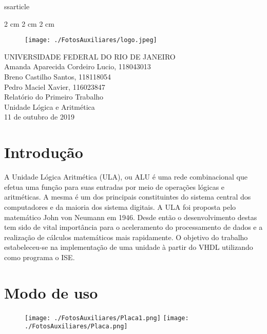 ss{article}
\usepackage[utf8]{inputenc}
\usepackage[brazil]{babel}
\usepackage{courier}
\usepackage{minted}
\usepackage{anysize}
\usepackage{graphicx}
\usepackage{url}
\usepackage{float}
\marginsize {2 cm} {2 cm} {2 cm} {2 cm} 

\begin{titlepage}
\begin{center}
\begin{figure}[H] %
    \centering
    \texttt{[image: ./FotosAuxiliares/logo.jpeg]}
\end{figure}
{\large UNIVERSIDADE FEDERAL DO RIO DE JANEIRO} \\[2.5cm]
{\large Amanda Aparecida Cordeiro Lucio, 118043013} \\[20pt]
{\large Breno Castilho Santos, 118118054} \\[20pt]
{\large Pedro Maciel Xavier, 116023847} \\[2.5cm]
{\Huge Relatório do Primeiro Trabalho} \\[20pt]
{\large Unidade Lógica e Aritmética} \\[2.5cm]
{\large 11 de outubro de 2019}
\end{center}
\end{titlepage}

\section{Introdução}
A  Unidade   Lógica   Aritmética   (ULA), ou ALU é uma rede combinacional que efetua uma função para suas entradas por meio de operações lógicas e aritméticas. A mesma é um dos principais constituintes do sistema central dos computadores e da maioria dos sistema digitais. A ULA foi proposta pelo matemático John von Neumann em 1946. Desde então o desenvolvimento destas tem sido de vital importância para o aceleramento do processamento de dados e a realização de cálculos matemáticos mais rapidamente.
O objetivo do trabalho estabeleceu-se na implementação de uma unidade à partir do VHDL utilizando como programa o ISE. 
\section{Modo de uso} 
\begin{figure}[H] %
    \centering
    \texttt{[image: ./FotosAuxiliares/Placa1.png]}
    \texttt{[image: ./FotosAuxiliares/Placa.png]}
\end{figure}


